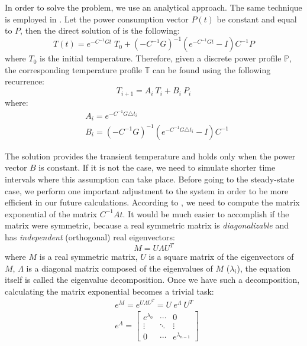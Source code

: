 In order to solve the problem, we use an analytical approach. The same technique is employed in \cite{thiele2011}. Let the power consumption vector $P(t)$ be constant and equal to $P$, then the direct solution of  is the following:
\begin{equation} \label{eq:solution}
  T(t) = e^{-C^{-1}G t} \; T_0 + (-C^{-1} G)^{-1}(e^{-C^{-1}G t} - I)C^{-1} P
\end{equation}
where $T_0$ is the initial temperature. Therefore, given a discrete power profile $\mathbb{P}$, the corresponding temperature profile $\mathbb{T}$ can be found using the following recurrence:
\[
  T_{i+1} = A_i \: T_i + B_i \: P_i
\]
where:
\begin{align*}
  & A_i = e^{-C^{-1} G \triangle t_i} \\
  & B_i = (-C^{-1} G)^{-1}(e^{-C^{-1}G \triangle t_i} - I)C^{-1}
\end{align*}

The solution provides the transient temperature and holds only when the power vector $B$ is constant. If it is not the case, we need to simulate shorter time intervals where this assumption can take place. Before going to the steady-state case, we perform one important adjustment to the system in order to be more efficient in our future calculations. According to , we need to compute the matrix exponential of the matrix $C^{-1} A t$. It would be much easier to accomplish if the matrix were symmetric, because a real symmetric matrix is \emph{diagonalizable} and has \emph{independent} (orthogonal) real eigenvectors:
\begin{equation} \label{eq:eigenvalue-decomposition}
  M = U \Lambda U^T
\end{equation}
where $M$ is a real symmetric matrix, $U$ is a square matrix of the eigenvectors of $M$, $\Lambda$ is a diagonal matrix composed of the eigenvalues of $M$ ($\lambda_i$), the equation itself is called the eigenvalue decomposition. Once we have such a decomposition, calculating the matrix exponential becomes a trivial task:
\begin{align}
  & e^M = e^{U \Lambda U^T} = U \: e^{\Lambda} \: U^T \nonumber \\
  & e^{\Lambda} = \left[
      \begin{array}{ccc}
        e^{\lambda_0} & \cdots & 0 \\
        \vdots & \ddots & \vdots \\
        0 & \cdots & e^{\lambda_{n - 1}}
      \end{array}
    \right] \nonumber
\end{align}

